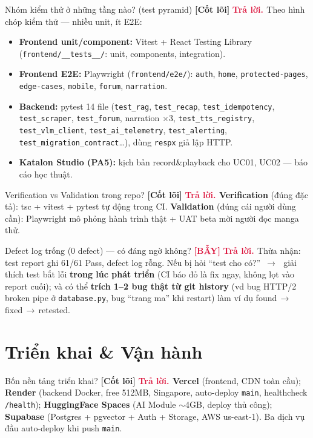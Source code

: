 \documentclass[11pt]{article}
\newcommand{\arr}{\,\ensuremath{\rightarrow}\,}
\newcommand{\code}[1]{\texttt{\small #1}}
\newcommand{\B}[1]{\textbf{#1}}
\newcommand{\tagCore}{\textcolor{steel}{\footnotesize\textbf{[Cốt lõi]}}}
\newcommand{\tagTrap}{\textcolor{crimson}{\footnotesize\textbf{[BẪY]}}}
\newcommand{\A}{\textbf{\textcolor{crimson}{Trả lời. }}}
\begin{document}
\begin{qa}{Nhóm kiểm thử ở những tầng nào? (test pyramid) \tagCore}
\A Theo hình chóp kiểm thử --- nhiều unit, ít E2E:
\begin{itemize}
  \item \B{Frontend unit/component:} Vitest + React Testing Library (\code{frontend/\_\_tests\_\_/}: unit, components, integration).
  \item \B{Frontend E2E:} Playwright (\code{frontend/e2e/}): \code{auth}, \code{home}, \code{protected-pages}, \code{edge-cases}, \code{mobile}, \code{forum}, \code{narration}.
  \item \B{Backend:} pytest 14 file (\code{test\_rag}, \code{test\_recap}, \code{test\_idempotency}, \code{test\_scraper}, \code{test\_forum}, narration $\times$3, \code{test\_tts\_registry}, \code{test\_vlm\_client}, \code{test\_ai\_telemetry}, \code{test\_alerting}, \code{test\_migration\_contract}\ldots), dùng \code{respx} giả lập HTTP.
  \item \B{Katalon Studio (PA5):} kịch bản record\&playback cho UC01, UC02 --- báo cáo học thuật.
\end{itemize}
\end{qa}

\begin{qa}{Verification vs Validation trong repo? \tagCore}
\A \B{Verification} (đúng đặc tả): tsc + vitest + pytest tự động trong CI. \B{Validation} (đúng cái người dùng cần): Playwright mô phỏng hành trình thật + UAT beta mời người đọc manga thử.
\end{qa}

\begin{qa}{Defect log trống (0 defect) --- có đáng ngờ không? \tagTrap}
\A Thừa nhận: test report ghi 61/61 Pass, defect log rỗng. Nếu bị hỏi ``test cho có?'' \arr\ giải thích test bắt lỗi \B{trong lúc phát triển} (CI báo đỏ là fix ngay, không lọt vào report cuối); và có thể \B{trích 1--2 bug thật từ git history} (vd bug HTTP/2 broken pipe ở \code{database.py}, bug ``trang ma'' khi restart) làm ví dụ found\arr fixed\arr retested.
\end{qa}

\section{Triển khai \& Vận hành}

\begin{qa}{Bốn nền tảng triển khai? \tagCore}
\A \B{Vercel} (frontend, CDN toàn cầu); \B{Render} (backend Docker, free 512MB, Singapore, auto-deploy \code{main}, healthcheck \code{/health}); \B{HuggingFace Spaces} (AI Module $\sim$4GB, deploy thủ công); \B{Supabase} (Postgres + pgvector + Auth + Storage, AWS us-east-1). Ba dịch vụ đầu auto-deploy khi push \code{main}.
\end{qa}
\end{document}
